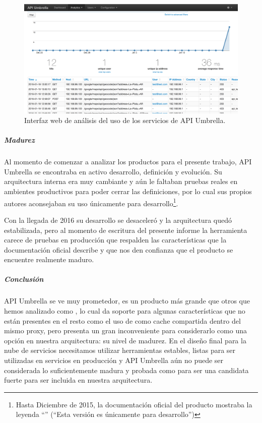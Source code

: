 \begin{figure}
  \includegraphics[width=\linewidth]{src/images/02-capitulo-2/tecnologias/api-umbrella/analytics.png}
  \caption{Interfaz web de análisis del uso de los servicios de API Umbrella.}
  \label{fig:api-umbrella-analytics}
\end{figure}

\subparagraph{Madurez}

Al momento de comenzar a analizar los productos para el presente trabajo, API Umbrella se encontraba en activo desarrollo, definición y evolución. Su arquitectura interna era muy cambiante y aún le faltaban pruebas reales en ambientes productivos para poder cerrar las definiciones, por lo cual sus propios autores aconsejaban su uso únicamente para desarrollo\footnote{Hasta Diciembre de 2015, la documentación oficial del producto mostraba la leyenda ``'' (``Esta versión es únicamente para desarrollo'')}.

Con la llegada de 2016 su desarrollo se desaceleró y la arquitectura quedó estabilizada, pero al momento de escritura del presente informe la herramienta carece de pruebas en producción que respalden las características que la documentación oficial describe y que nos den confianza que el producto se encuentre realmente maduro.

\subparagraph{Conclusión}

API Umbrella se ve muy prometedor, es un producto más grande que otros que hemos analizado como , lo cual da soporte para algunas características que no están presentes en el resto como el uso de  como cache compartida dentro del mismo proxy, pero presenta un gran inconveniente para considerarlo como una opción en nuestra arquitectura: su nivel de madurez. En el diseño final para la nube de servicios necesitamos utilizar herramientas estables, listas para ser utilizadas en servicios en producción y API Umbrella aún no puede ser considerada lo suficientemente madura y probada como para ser una candidata fuerte para ser incluida en nuestra arquitectura.
